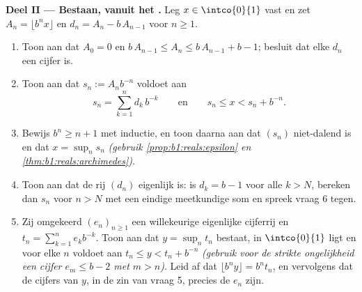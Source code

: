 \begin{problem}
\medskip
\noindent\textbf{Deel II --- Bestaan, vanuit het .} Leg $x \in
\intco{0}{1}$ vast en zet $A_n = \lfloor b^n x \rfloor$ en $d_n = A_n -
b\,A_{n-1}$ voor $n \geq 1$.
\begin{enumerate}[resume]
  \item Toon aan dat $A_0 = 0$ en $b\,A_{n-1} \leq A_n \leq b\,A_{n-1} +
        b - 1$; besluit dat elke $d_n$ een cijfer is.
  \item Toon aan dat $s_n := A_n b^{-n}$ voldoet aan
        \[
        s_n = \sum_{k=1}^{n} d_k\,b^{-k}
        \qquad\text{en}\qquad
        s_n \leq x < s_n + b^{-n} .
        \]
  \item Bewijs $b^n \geq n + 1$ met inductie, en toon daarna aan dat
        $(s_n)$ niet-dalend is en dat $x = \sup_n s_n$ \emph{(gebruik
        \cref{prop:b1:reals:epsilon} en
        \cref{thm:b1:reals:archimedes})}.
  \item Toon aan dat de rij $(d_n)$ eigenlijk is: is $d_k = b - 1$ voor
        alle $k > N$, bereken dan $s_n$ voor $n > N$ met een eindige
        meetkundige som en spreek vraag 6 tegen.
  \item Zij omgekeerd $(e_n)_{n \geq 1}$ een willekeurige eigenlijke
        cijferrij en $t_n = \sum_{k=1}^n e_k b^{-k}$. Toon aan dat $y =
        \sup_n t_n$ bestaat, in $\intco{0}{1}$ ligt en voor elke $n$
        voldoet aan $t_n \leq y < t_n + b^{-n}$ \emph{(gebruik voor de
        strikte ongelijkheid een cijfer $e_m \leq b - 2$ met $m > n$)}.
        Leid af dat $\lfloor b^n y \rfloor = b^n t_n$, en vervolgens dat
        de cijfers van $y$, in de zin van vraag 5, precies de $e_n$
        zijn.
\end{enumerate}


\end{problem}
